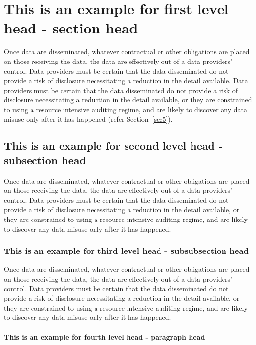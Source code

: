 \documentclass[unnumsec,webpdf,contemporary,large]{oup-authoring-template}%
\theoremstyle{thmstyleone}%
\theoremstyle{thmstyletwo}%
\theoremstyle{thmstylethree}%
\begin{document}
\section{This is an example for first level head - section head}\label{sec2}

Once data are disseminated, whatever contractual or other obligations are placed on those receiving the
data, the data are effectively out of a data providers' control. Data providers must be certain that the data
disseminated do not provide a risk of disclosure necessitating a reduction in the detail available.
Data providers must be certain that the data disseminated do not provide a risk of disclosure necessitating
a reduction in the detail available, or they are constrained to using a resource intensive auditing regime,
and are likely to discover any data misuse only after it has happened (refer Section~\ref{sec5}).

\subsection{This is an example for second level head - subsection head}\label{subsec1}

Once data are disseminated, whatever contractual or other obligations are placed on those receiving the
data, the data are effectively out of a data providers' control. Data providers must be certain that the data
disseminated do not provide a risk of disclosure necessitating a reduction in the detail available, or they are
constrained to using a resource intensive auditing regime, and are likely to discover any data misuse only
after it has happened.

\subsubsection{This is an example for third level head - subsubsection head}\label{subsubsec1}

Once data are disseminated, whatever contractual or other obligations are placed on those receiving the
data, the data are effectively out of a data providers' control. Data providers must be certain that the data
disseminated do not provide a risk of disclosure necessitating a reduction in the detail available, or they are
constrained to using a resource intensive auditing regime, and are likely to discover any data misuse only
after it has happened.

\paragraph{This is an example for fourth level head - paragraph head}
\end{document}
